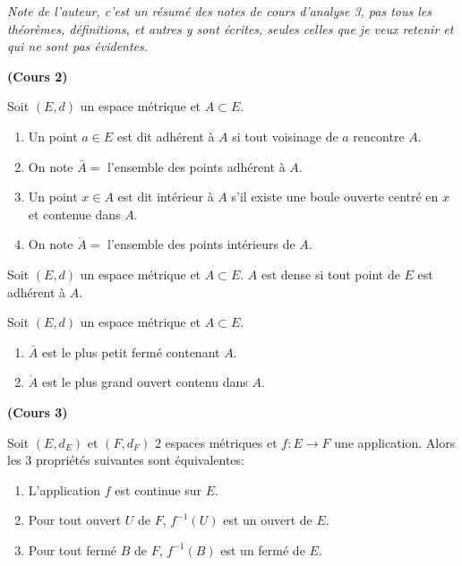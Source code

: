 \documentclass[12pt,a4paper]{article}
\begin{document}
\begin{flushleft}

\textit{Note de l'auteur, c'est un résumé des notes de cours d'analyse 3, pas tous les théorèmes, définitions, et autres y sont écrites, seules celles que je veux retenir et qui ne sont pas évidentes.}\dbs

\textbf{(Cours 2)}

\begin{mydef} 
Soit $(E,d)$ un espace métrique et $A \subset E$.
\begin{enumerate}
\item Un point $a \in E$ est dit adhérent à $A$ si tout voisinage de $a$ rencontre $A$.
\item On note $\bar{A} = $ l'ensemble des points adhérent à $A$.
\item Un point $x \in A$ est dit intérieur à $A$ s'il existe une boule ouverte centré en $x$ et contenue dans $A$.
\item On note $\mathring{A} = $ l'ensemble des points intérieurs de $A$.
\end{enumerate}
\end{mydef}

\begin{mydef}
Soit $(E,d)$ un espace métrique et $A \subset E$. $A$ est dense si tout point de $E$ est adhérent à $A$.
\end{mydef}

\begin{thm} 
Soit $(E,d)$ un espace métrique et $A \subset E$.
\begin{enumerate}
\item $\bar{A}$ est le plus petit fermé contenant $A$.
\item $\mathring{A}$ est le plus grand ouvert contenu dans $A$.
\end{enumerate}
\end{thm}

\textbf{(Cours 3)}

\begin{thm} 
Soit $(E,d_E)$ et $(F,d_F)$ 2 espaces métriques et $f: E \longrightarrow F$ une application. Alors les 3 propriétés suivantes sont équivalentes:
\begin{enumerate}
\item L'application $f$ est continue sur $E$.
\item Pour tout ouvert $U$ de $F$, $ f^{-1} (U) $ est un ouvert de $E$.
\item Pour tout fermé $B$ de $F$, $ f^{-1} (B) $ est un fermé de $E$.
\end{enumerate}
\end{thm}




\end{flushleft}
\end{document}
